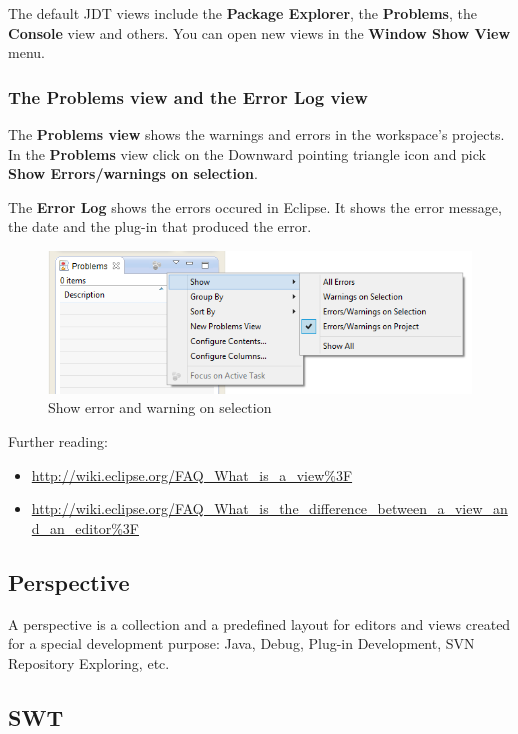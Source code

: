 \documentclass[]{report}
\let\Oldincludegraphics\includegraphics
\renewcommand{\includegraphics}[1]{
\begin{adjustbox}{max size={\textwidth}{\textheight}}
    \Oldincludegraphics[scale=0.6]{#1}%
\end{adjustbox}
}
\begin{document}
The default JDT views include the \textbf{Package Explorer}, the
\textbf{Problems}, the \textbf{Console} view and others. You can open
new views in the \textbf{Window \textbar{} Show View} menu.

\subsubsection{The Problems view and the Error Log view}

The \textbf{Problems view} shows the warnings and errors in the
workspace's projects. In the \textbf{Problems} view click on the
Downward pointing triangle icon and pick \textbf{Show \textbar{}
Errors/warnings on selection}.

The \textbf{Error Log} shows the errors occured in Eclipse. It shows the
error message, the date and the plug-in that produced the error.

\begin{figure}[htbp]
\centering
\includegraphics{img/eclipse_basics/problems.png}
\caption{Show error and warning on selection}
\end{figure}

Further reading:

\begin{itemize}
\itemsep1pt\parskip0pt
\item
  \url{http://wiki.eclipse.org/FAQ_What_is_a_view\%3F}
\item
  \url{http://wiki.eclipse.org/FAQ_What_is_the_difference_between_a_view_and_an_editor\%3F}
\end{itemize}

\subsection{Perspective}

A perspective is a collection and a predefined layout for editors and
views created for a special development purpose: Java, Debug, Plug-in
Development, SVN Repository Exploring, etc.

\subsection{SWT}
\end{document}
